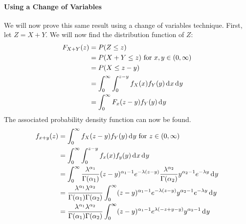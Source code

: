 \documentclass[12pt]{article}
\begin{document}
\paragraph{Using a Change of Variables}
We will now prove this same result using a change of variables technique. First, let $Z = X + Y$. We will now find the
distribution function of $Z$:
\begin{equation}
	\begin{split}
		F_{X+Y}(z)	&=	P(Z \leq z)\\
					&=	P(X+Y \leq z)\text{ for } x, y\in(0, \infty)\\
					&=	P(X \leq z - y)\\
					&=	\int_{0}^{\infty} \int_{0}^{z-y} f_X (x) f_Y (y)\mathop{}\!\mathrm{d^{}}x\mathop{}\!\mathrm{d^{}}y\\
					&=	\int_{0}^{\infty} F_x (z-y) f_Y (y)\mathop{}\!\mathrm{d^{}}y\\
	\end{split}
\end{equation}
The associated probability density function can now be found.
\begin{equation}
	\begin{split}
		f_{x+y}(z)	&=	\int_{0}^{\infty} f_X(z-y)f_Y (y)\mathop{}\!\mathrm{d^{}}y \text{ for } z\in(0, \infty)\\
					&=	\int_{0}^{\infty} \int_{0}^{z-y} f_x(x)f_y(y)\mathop{}\!\mathrm{d^{}}x\mathop{}\!\mathrm{d^{}}y\\
					&=	\int_{0}^{\infty} \frac{\lambda^{\alpha_1}}{\Gamma(\alpha_1)} (z-y)^{\alpha_1 - 1} e^{-\lambda(z-y)} \frac{\lambda^{\alpha_2}}{\Gamma(\alpha_2)} y^{\alpha_2 - 1} e^{-\lambda y}\mathop{}\!\mathrm{d^{}}y\\
					&=	\frac{\lambda^{\alpha_1} \lambda^{\alpha_2}}{\Gamma(\alpha_1) \Gamma(\alpha_2)} \int_{0}^{\infty} (z-y)^{\alpha_1 - 1} e^{-\lambda(z-y)} y^{\alpha_2 - 1} e^{-\lambda y}\mathop{}\!\mathrm{d^{}}y\\
					&=	\frac{\lambda^{\alpha_1} \lambda^{\alpha_2}}{\Gamma(\alpha_1) \Gamma(\alpha_2)} \int_{0}^{\infty} (z-y)^{\alpha_1 - 1} e^{\lambda(-z+y-y)} y^{\alpha_2 - 1}\mathop{}\!\mathrm{d^{}}y\\
	\end{split}
\end{equation}
\end{document}
